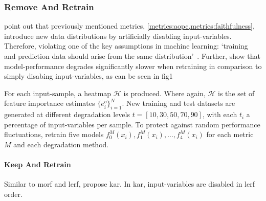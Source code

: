 \subsubsection{Remove And Retrain}\label{metrics:roar}
\citeauthor{Hooker.2019} point out that previously mentioned metrics, \cref{metrics:aopc,metrics:faithfulness}, introduce new data distributions by artificially disabling input-variables. Therefore, violating one of the key assumptions in machine learning: `training and prediction data should arise from the same distribution'~\cite{McGaughey.2016}. Further, \citeauthor{Hooker.2019} show that model-performance degrades significantly slower when retraining in comparison to simply disabing input-variables, as can be seen in fig1
\par
For each input-sample, a heatmap \(\mathscr H\) is produced. Where again,
\(\mathscr H\) is the set of feature importance estimates \( \{ e^{o}_{i} \}^N_{i=1} \). New training and test datasets are generated at different degradation levels \(t=\left[10, 30, 50, 70, 90 \right]\), with each \(t_i\) a percentage of input-variables per sample. To protect against random performance fluctuations, \citeauthor{Hooker.2019} retrain five models \(f_0^M(x_i), f_1^M(x_i),\ldots, f_4^M(x_i)\) for each metric \(M\) and each degradation method.

\paragraph{Keep And Retrain}
Similar to \gls{morf} and \gls{lerf}, \citeauthor{Hooker.2019} propose \gls{kar}. In \gls{kar}, input-variables are disabled in \gls{lerf} order.

